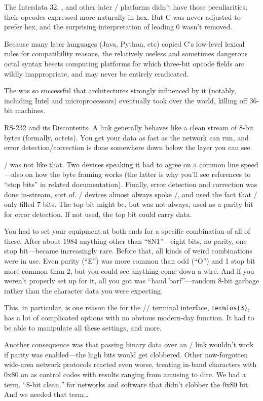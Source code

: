 The Interdata 32, , and other later \UNIX/ platforms didn't have those
peculiarities; their opcodes expressed more naturally in hex. But C was never
adjusted to prefer hex, and the surprising interpretation of leading 0 wasn't
removed.

Because many later languages (Java, Python, etc) copied C's low-level lexical
rules for compatibility reasons, the relatively useless and sometimes dangerous
octal syntax besets computing platforms for which three-bit opcode fields are
wildly inappropriate, and may never be entirely eradicated.

The  was so successful that architectures strongly influenced by it
(notably, including Intel and  microprocessors) eventually took over the
world, killing off 36-bit machines.

\sect RS-232 and its Discontents.
A  link generally behaves like a clean stream of 8-bit bytes (formally,
octets). You get your data as fast as the network can run, and error
detection/correction is done somewhere down below the layer you can see.

\RSTTT/ was not like that. Two devices speaking it had to agree on a common line
speed---also on how the byte framing works (the latter is why you'll see
references to ``stop bits'' in related documentation). Finally, error detection
and correction was done in-stream, sort of. \RSTTT/ devices almost always spoke
\ASCII/, and used the fact that \ASCII/ only filled 7 bits. The top bit might be,
but was not always, used as a parity bit for error detection. If not used, the
top bit could carry data.

You had to set your equipment at both ends for a specific combination of all of
these. After about 1984 anything other than ``8N1''---eight bits, no parity, one
stop bit---became increasingly rare. Before that, all kinds of weird
combinations were in use. Even parity (``E'') was more common than odd (``O'') and
1 stop bit more common than 2, but you could see anything come down a wire.
And if you weren't properly set up for it, all you got was ``baud barf''---random
8-bit garbage rather than the character data you were expecting.

This, in particular, is one reason the  for the /\UNIX/ terminal
interface, {\tt termios(3)}, has a lot of complicated options with no obvious
modern-day function. It had to be able to manipulate all these settings, and
more.

Another consequence was that passing binary data over an \RSTTT/ link wouldn't
work if parity was enabled---the high bits would get clobbered. Other
now-forgotten wide-area network protocols reacted even worse, treating in-band
characters with 0x80 on as control codes with results ranging from amusing to
dire. We had a term, ``8-bit clean,'' for networks and software that didn't
clobber the 0x80 bit. And we needed that term…

